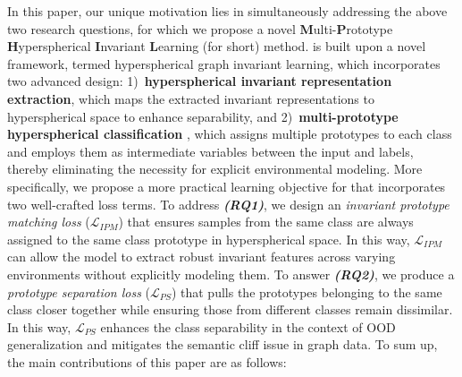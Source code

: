 In this paper, our unique motivation lies in simultaneously addressing the above two research questions, for which we propose a novel \textbf{M}ulti-\textbf{P}rototype \textbf{H}yperspherical \textbf{I}nvariant \textbf{L}earning (\ourmethod for short) method. \ourmethod is built upon a novel framework, termed hyperspherical graph invariant learning, which incorporates two advanced design: 1)~\textbf{hyperspherical invariant representation extraction}, which maps the extracted invariant representations to hyperspherical space to enhance separability, and 2)~\textbf{multi-prototype hyperspherical classification }, which assigns multiple prototypes to each class and employs them as intermediate variables between the input and labels, thereby eliminating the necessity for explicit environmental modeling.
More specifically, we propose a more practical learning objective for \ourmethod that incorporates two well-crafted loss terms. To address \textbf{\textit{(RQ1)}}, we design an \textit{invariant prototype matching loss} ($\mathcal{L}_{IPM}$) that ensures samples from the same class are always 
assigned to the same class prototype in hyperspherical space. In this way, $\mathcal{L}_{IPM}$ can allow the model to extract robust invariant features across varying environments without explicitly modeling them. To answer \textbf{\textit{(RQ2)}}, we produce a \textit{prototype separation loss} ($\mathcal{L}_{PS}$) that pulls the prototypes belonging to the same class closer together while ensuring those from different classes remain dissimilar. In this way, $\mathcal{L}_{PS}$ enhances the class separability in the context of OOD generalization and mitigates the semantic cliff issue in graph data. %
To sum up, the main contributions of this paper are as follows:

